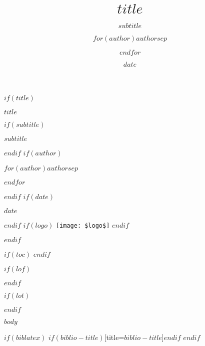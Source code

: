 \documentclass[$if(fontsize)$$fontsize$,$endif$$if(lang)$$babel-lang$,$endif$$if(papersize)$$papersize$,$endif$]{article}
\title{\sffamily\LARGE\bfseries\color{accent}$title$}
\subtitle{$subtitle$}
\author{$for(author)$$author$$sep$ \and $endfor$}
\date{$date$}
\begin{document}
$if(title)$
\begin{titlepage}
\centering
\vspace*{2cm}
{\Huge\bfseries\sffamily\color{accent}$title$\par}
\vspace{1cm}
$if(subtitle)$
{\Large\sffamily\color{darkgray}$subtitle$\par}
\vspace{1cm}
$endif$
$if(author)$
{\large\sffamily $for(author)$$author$$sep$ \par $endfor$\par}
\vspace{0.5cm}
$endif$
$if(date)$
{\large\sffamily $date$\par}
$endif$
\vfill
$if(logo)$
\texttt{[image: \$logo\$]}
\vspace{1cm}
$endif$
\end{titlepage}
$endif$

$if(toc)$
\tableofcontents
\newpage
$endif$

$if(lof)$
\listoffigures
\newpage
$endif$

$if(lot)$
\listoftables
\newpage
$endif$

$body$

$if(biblatex)$
\printbibliography$if(biblio-title)$[title=$biblio-title$]$endif$
$endif$
\end{document}
